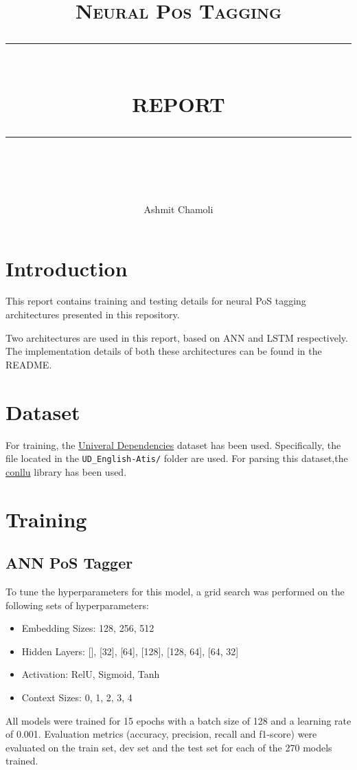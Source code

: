\documentclass[a4paper,9pt]{report}
\newcommand{\HRule}[1]{\rule{\linewidth}{#1}}
\begin{document}
\title{ \normalsize \textsc{\LARGE Neural Pos Tagging}
		\\ [2.0cm]
		\HRule{0.5pt} \\
		\LARGE \textbf{\uppercase{Report}}
		\HRule{2pt} \\ [0.5cm]
		\normalsize \vspace*{3\baselineskip}}
        \date{ }

\author{Ashmit Chamoli }

\maketitle
\section*{Introduction}
This report contains training and testing details for neural PoS tagging architectures presented in this repository.

Two architectures are used in this report, based on ANN and LSTM respectively. The implementation details of both these architectures can be found in the README.

\section*{Dataset}
For training, the \href{https://lindat.mff.cuni.cz/repository/xmlui/bitstream/handle/11234/1-5287/ud-treebanks-v2.13.tgz}{Univeral Dependencies} dataset has been used. Specifically, the file located in the \verb|UD_English-Atis/| folder are used.
For parsing this dataset,the \href{https://pypi.org/project/conllu/}{conllu} library has been used. 

\section*{Training}
\subsection*{ANN PoS Tagger}
To tune the hyperparameters for this model, a grid search was performed on the following sets of hyperparameters:
\begin{itemize}
    \item Embedding Sizes: 128, 256, 512
    \item Hidden Layers: [], [32], [64], [128], [128, 64], [64, 32]
    \item Activation: RelU, Sigmoid, Tanh
    \item Context Sizes: 0, 1, 2, 3, 4  
\end{itemize}
All models were trained for 15 epochs with a batch size of 128 and a learning rate of 0.001. Evaluation metrics (accuracy, precision, recall and f1-score) were evaluated on the train set, dev set and the test set for each of the 270 models trained.
\end{document}
